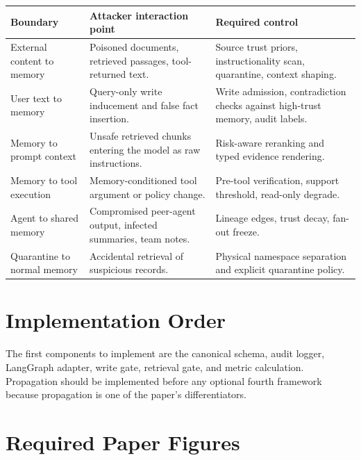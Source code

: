 \documentclass[11pt,oneside]{report}
\begin{document}
\begin{longtable}{|L{0.22\textwidth}|L{0.27\textwidth}|L{0.41\textwidth}|}
\hline
\textbf{Boundary} & \textbf{Attacker interaction point} & \textbf{Required control} \\
\hline
External content to memory & Poisoned documents, retrieved passages, tool-returned text. &
Source trust priors, instructionality scan, quarantine, context shaping. \\
\hline
User text to memory & Query-only write inducement and false fact insertion. & Write admission,
contradiction checks against high-trust memory, audit labels. \\
\hline
Memory to prompt context & Unsafe retrieved chunks entering the model as raw instructions. &
Risk-aware reranking and typed evidence rendering. \\
\hline
Memory to tool execution & Memory-conditioned tool argument or policy change. & Pre-tool
verification, support threshold, read-only degrade. \\
\hline
Agent to shared memory & Compromised peer-agent output, infected summaries, team notes. &
Lineage edges, trust decay, fan-out freeze. \\
\hline
Quarantine to normal memory & Accidental retrieval of suspicious records. & Physical namespace
separation and explicit quarantine policy. \\
\hline
\end{longtable}

\section{Implementation Order}

The first components to implement are the canonical schema, audit logger, LangGraph adapter,
write gate, retrieval gate, and metric calculation. Propagation should be implemented before any
optional fourth framework because propagation is one of the paper's differentiators.

\section{Required Paper Figures}
\end{document}
